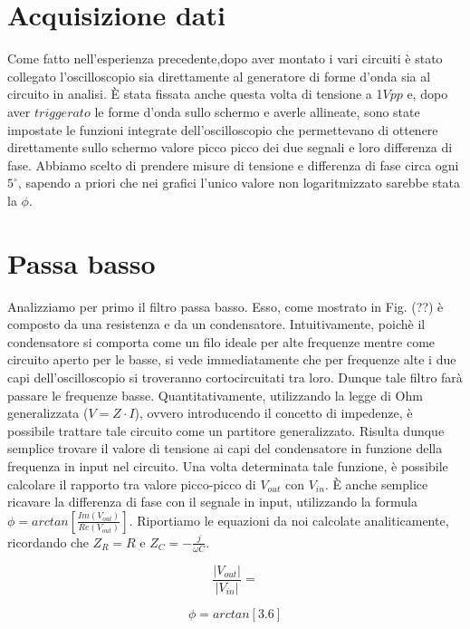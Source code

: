 \section{Acquisizione dati}
Come fatto nell'esperienza precedente,dopo aver montato i vari circuiti è stato collegato l'oscilloscopio sia direttamente al generatore di forme d'onda sia al circuito in analisi.  \`E stata fissata anche questa volta di tensione a 1$Vpp$ e, dopo aver $triggerato$ le forme d'onda sullo schermo e averle allineate, sono state impostate le funzioni integrate dell'oscilloscopio che permettevano di ottenere direttamente sullo schermo valore picco picco dei due segnali e loro differenza di fase. Abbiamo scelto di prendere misure di tensione e differenza di fase circa ogni $5^{\circ}$, sapendo a priori che nei grafici l'unico valore non logaritmizzato sarebbe stata la $\phi$.  


\section{Passa basso}
Analizziamo per primo il filtro passa basso. Esso, come mostrato in Fig. (??) è composto da una resistenza e da un condensatore. Intuitivamente, poichè il condensatore si comporta come un filo ideale per alte frequenze mentre come circuito aperto per le basse, si vede immediatamente che per frequenze alte i due capi dell'oscilloscopio si troveranno cortocircuitati tra loro. Dunque tale filtro farà passare le frequenze basse. Quantitativamente, utilizzando la legge di Ohm generalizzata ($V=Z \cdot I$), ovvero introducendo il concetto di impedenze, è possibile trattare tale circuito come un partitore generalizzato. Risulta dunque semplice trovare il valore di tensione ai capi del condensatore in funzione della frequenza in input nel circuito. Una volta determinata tale funzione, è possibile calcolare il rapporto tra valore picco-picco di $V_{out}$ con $V_{in}$. \`E anche semplice ricavare la differenza di fase con il segnale in input, utilizzando la formula $\phi=arctan[\frac{Im(V_{out})}{Re(V_{out})}]$. Riportiamo le equazioni da noi calcolate analiticamente, ricordando che $Z_R=R$ e $Z_C=-\frac{j}{\omega C}$.

\begin{equation}
\frac{|V_{out}|}{|V_{in}|}=
\end{equation}

\begin{equation}
\phi=arctan[3.6]
\end{equation}

